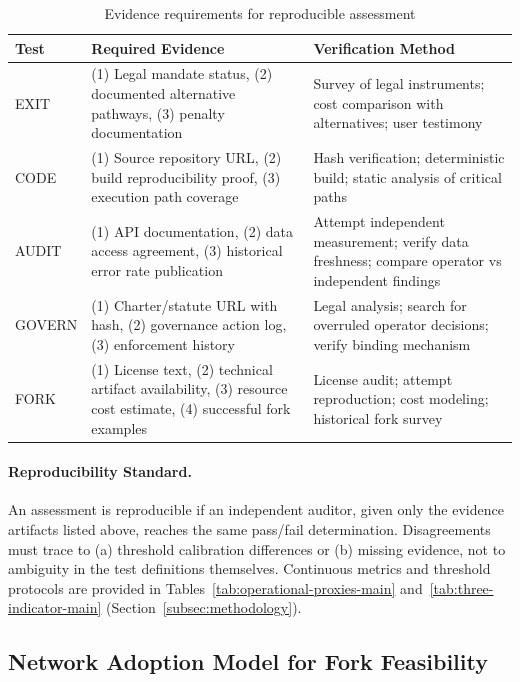 \begin{table}[htbp]
\centering
\small
\caption{Evidence requirements for reproducible assessment}
\label{tab:evidence-requirements}
\begin{tabular}{@{}lp{5cm}p{5cm}@{}}
\toprule
\textbf{Test} & \textbf{Required Evidence} & \textbf{Verification Method} \\
\midrule
EXIT & (1) Legal mandate status, (2) documented alternative pathways, (3) penalty documentation & Survey of legal instruments; cost comparison with alternatives; user testimony \\
CODE & (1) Source repository URL, (2) build reproducibility proof, (3) execution path coverage & Hash verification; deterministic build; static analysis of critical paths \\
AUDIT & (1) API documentation, (2) data access agreement, (3) historical error rate publication & Attempt independent measurement; verify data freshness; compare operator vs independent findings \\
GOVERN & (1) Charter/statute URL with hash, (2) governance action log, (3) enforcement history & Legal analysis; search for overruled operator decisions; verify binding mechanism \\
FORK & (1) License text, (2) technical artifact availability, (3) resource cost estimate, (4) successful fork examples & License audit; attempt reproduction; cost modeling; historical fork survey \\
\bottomrule
\end{tabular}
\end{table}

\paragraph{Reproducibility Standard.} An assessment is reproducible if an independent auditor, given only the evidence artifacts listed above, reaches the same pass/fail determination. Disagreements must trace to (a) threshold calibration differences or (b) missing evidence, not to ambiguity in the test definitions themselves. Continuous metrics and threshold protocols are provided in Tables~\ref{tab:operational-proxies-main} and~\ref{tab:three-indicator-main} (Section~\ref{subsec:methodology}).

\subsection{Network Adoption Model for Fork Feasibility}

